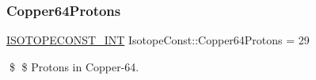 \subsubsection{\texorpdfstring{Copper64\+Protons}{Copper64Protons}}
{\footnotesize\ttfamily \mbox{\hyperlink{group___isotope_const-_macros_ga5f18360b3e99483a35c32d789e62621c}{I\+S\+O\+T\+O\+P\+E\+C\+O\+N\+S\+T\+\_\+\+I\+NT}} Isotope\+Const\+::\+Copper64\+Protons = 29}

\$ \$ Protons in Copper-\/64. 
